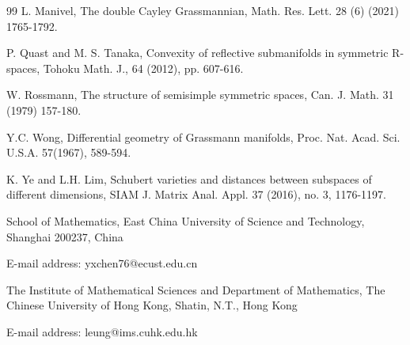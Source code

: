 \documentclass{article}
\begin{document}
\begin{thebibliography}{99}
L. Manivel, The double Cayley Grassmannian, Math. Res. Lett. 28 (6) (2021) 1765-1792.

P. Quast and M. S. Tanaka, Convexity of reflective submanifolds in symmetric R-spaces, Tohoku Math. J., 64 (2012), pp. 607-616.

W. Rossmann, The structure of semisimple symmetric spaces, Can. J. Math. 31 (1979) 157-180.


Y.C. Wong, Differential geometry of Grassmann manifolds, Proc. Nat. Acad. Sci. U.S.A. 57(1967), 589-594.

K. Ye and L.H. Lim, Schubert varieties and distances between subspaces of different dimensions, SIAM J. Matrix Anal. Appl. 37 (2016), no. 3, 1176-1197.
\end{thebibliography}


\bigskip

School of Mathematics, East China University of Science and Technology, Shanghai 200237, China

E-mail address: yxchen76@ecust.edu.cn

\bigskip

The Institute of Mathematical Sciences and Department of Mathematics, The
Chinese University of Hong Kong, Shatin, N.T., Hong Kong

E-mail address: leung@ims.cuhk.edu.hk
\end{document}
